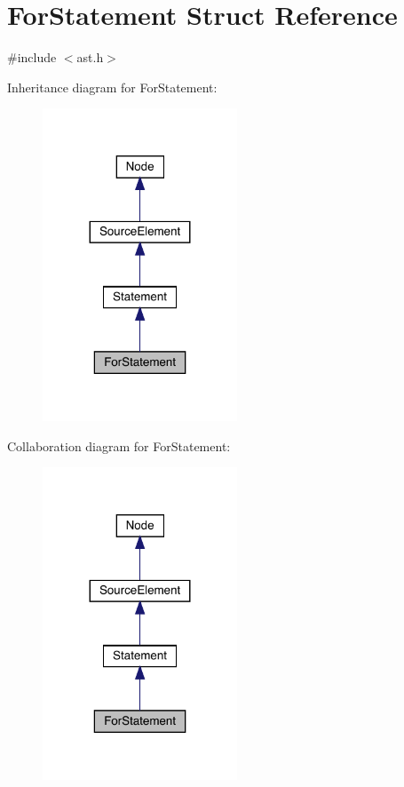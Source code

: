 \hypertarget{struct_for_statement}{}\section{For\+Statement Struct Reference}
\label{struct_for_statement}


{\ttfamily \#include $<$ast.\+h$>$}



Inheritance diagram for For\+Statement\+:
\nopagebreak
\begin{figure}[H]
\begin{center}
\leavevmode
\includegraphics[width=164pt]{struct_for_statement__inherit__graph}
\end{center}
\end{figure}


Collaboration diagram for For\+Statement\+:
\nopagebreak
\begin{figure}[H]
\begin{center}
\leavevmode
\includegraphics[width=164pt]{struct_for_statement__coll__graph}
\end{center}
\end{figure}
